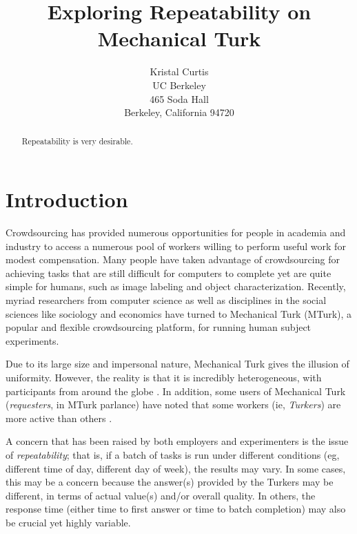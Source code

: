 \documentclass[letterpaper]{article}
\begin{document}
%
\title{Exploring Repeatability on Mechanical Turk}
\author{Kristal Curtis\\
UC Berkeley\\
465 Soda Hall\\
Berkeley, California 94720\\
}
\maketitle
\begin{abstract}
Repeatability is very desirable.
\end{abstract}

\section{Introduction}

Crowdsourcing has provided numerous opportunities for people in academia and industry to access a numerous pool of workers willing to perform useful work for modest compensation.  Many people have taken advantage of crowdsourcing for achieving tasks that are still difficult for computers to complete yet are quite simple for humans, such as image labeling and object characterization.  Recently, myriad researchers from computer science as well as disciplines in the social sciences like sociology and economics have turned to Mechanical Turk (MTurk), a popular and flexible crowdsourcing platform, for running human subject experiments.

Due to its large size and impersonal nature, Mechanical Turk gives the illusion of uniformity.  However, the reality is that it is incredibly heterogeneous, with participants from around the globe \cite{Ipeirotis:2010a}.  In addition, some users of Mechanical Turk (\textit{requesters}, in MTurk parlance) have noted that some workers (ie, \textit{Turkers}) are more active than others \cite{Franklin:2011}.

A concern that has been raised by both employers and experimenters is the issue of \textit{repeatability}; that is, if a batch of tasks is run under different conditions (eg, different time of day, different day of week), the results may vary.  In some cases, this may be a concern because the answer(s) provided by the Turkers may be different, in terms of actual value(s) and/or overall quality.   In others, the response time (either time to first answer or time to batch completion) may also be  crucial yet highly variable.
\end{document}
